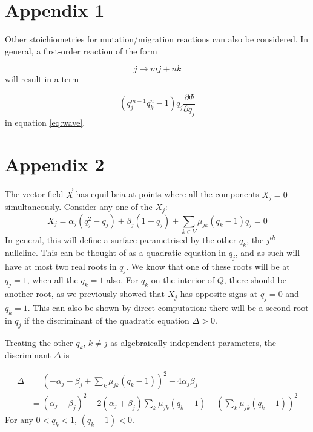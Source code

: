 \documentclass{article}
\begin{document}





\section{Appendix 1}

Other stoichiometries for mutation/migration reactions can also be considered.
In general, a first-order reaction of the form

\begin{equation}
    j \rightarrow m j + n k
\end{equation}
will result in a term

\begin{equation}
    (q_j^{m-1} q_k^n - 1) q_j \frac{\partial \Psi}{\partial q_j}
\end{equation}
in equation \eqref{eq:wave}.

\section{Appendix 2}

The vector field $\vec{X}$ has equilibria at points where all the components
$X_j = 0$ simultaneously. Consider any one of the $X_j$:
\begin{equation}
    X_j = \alpha_j (q_j^2 - q_j) + \beta_j (1 - q_j) 
          + \sum_{k \in V} \mu_{jk} (q_k - 1) q_j = 0
\end{equation}
In general, this will define a surface parametrised by the other $q_k$, the
$j^{th}$ nullcline.
This can be thought of as a quadratic equation in $q_j$, and as such will have
at most two real roots in $q_j$. We know that one of these roots will be at $q_j
= 1$, when all the $q_k = 1$ also. For $q_k$ on the interior of $Q$, there
should be another root, as we previously showed that $X_j$ has opposite signs at
$q_j = 0$ and $q_k = 1$. This can also be shown by direct computation: there
will be a second root in $q_j$ if the discriminant of the quadratic equation $\Delta > 0$.

Treating the other $q_k$, $k \neq j$ as algebraically independent parameters,
the discriminant $\Delta$ is

\begin{align}
    \Delta &= (-\alpha_j -\beta_j + \sum_k \mu_{jk} (q_k - 1))^2 - 4\alpha_j \beta_j
    \nonumber \\
    &= (\alpha_j - \beta_j)^2 - 2 (\alpha_j + \beta_j) \sum_k \mu_{jk} (q_k - 1)
    +(\sum_k \mu_{jk} (q_k - 1))^2
\end{align}
For any $0 < q_k < 1$, $(q_k - 1) < 0$.
\end{document}
